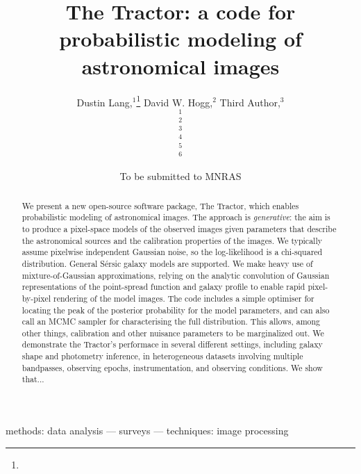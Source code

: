 \documentclass[useAMS,usenatbib]{mn2e}
\title[The Tractor]
{The Tractor: a code for probabilistic modeling of astronomical images}
\author[All of us]{%
  Dustin Lang,$^{1}$\thanks{\email}
  David W. Hogg,$^{2}$
  Third Author,$^{3}$
\newauthor{%
  Fourth Author,$^{4}$
  Fifth Author,$^{5}$
  Sixth Author.$^{6}$}
  \medskip\\
  $^1$\cmu\\
  $^2$\nyu\\
  $^3$\thirdplace\\
  $^4$\fourthplace\\
  $^5$\fifthplace\\
  $^6$\sixthplace\\
}
\begin{document}
             
\date{To be submitted to MNRAS}
             
\pagerange{\pageref{firstpage}--\pageref{lastpage}}

\maketitle

\label{firstpage}


\begin{abstract}

We present a new open-source software package, The Tractor, which
enables probabilistic modeling of astronomical images.  The approach
is \emph{generative}: the aim is to produce a pixel-space models of
the observed images given parameters that describe the astronomical
sources and the calibration properties of the images.  We typically
assume pixelwise independent Gaussian noise, so the log-likelihood is
a chi-squared distribution.
%
General S\'ersic galaxy models are supported.  We make heavy use of
mixture-of-Gaussian approximations, relying on the analytic
convolution of Gaussian representations of the point-spread function
and galaxy profile to enable rapid pixel-by-pixel rendering of the
model images.
%
%
The code includes a simple optimiser for locating the peak of the
posterior probability for the model parameters, and can also call an
MCMC sampler for characterising the full distribution.  This allows,
among other things, calibration and other nuisance parameters to be
marginalized out.  We demonstrate the Tractor's performace in several
different settings, including galaxy shape and photometry inference,
in heterogeneous datasets involving multiple bandpasses, observing
epochs, instrumentation, and observing conditions. We show that...

\end{abstract}

\begin{keywords}
methods: data analysis --- surveys --- techniques: image processing
\end{keywords}
\end{document}
